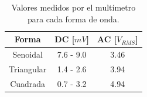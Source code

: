 \documentclass{replab}
\begin{document}
		\begin{table}[ht]
		\centering
			\begin{tabular}{|c|c|c|}
			\hline
			Forma      & DC [$mV$] & AC [$V_{RMS}$] \\ \hline
			Senoidal   & 7.6 - 9.0 & 3.46           \\ \hline
			Triangular & 1.4 - 2.6 & 3.94           \\ \hline
			Cuadrada   & 0.7 - 3.2 & 4.94           \\ \hline
			\end{tabular}
		\caption{Valores medidos por el multímetro para cada forma de onda.}
		\label{tab:triangular}
		\end{table}
	
\end{document}

